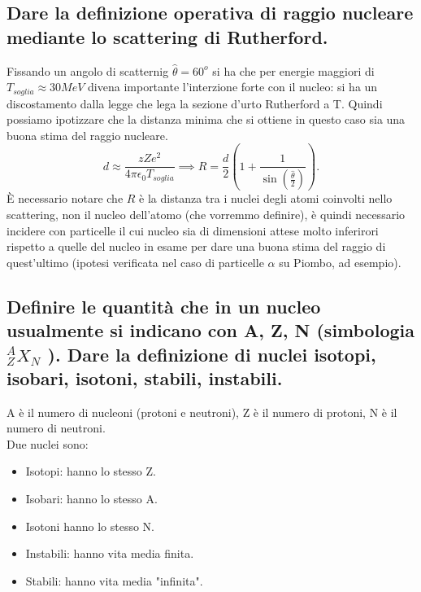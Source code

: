 \subsection[]{ Dare la definizione operativa di raggio nucleare mediante lo scattering di Rutherford.}
Fissando un angolo di scatternig $\hat{\theta} = 60^o$ si ha che per energie maggiori di $T_{soglia} \approx 30 MeV$ divena importante l'interzione forte con il nucleo: si ha un discostamento dalla legge che lega la sezione d'urto Rutherford a T. Quindi possiamo ipotizzare che la distanza minima che si ottiene in questo caso sia una buona stima del raggio nucleare.
\[
	d \approx \frac{zZ e^2}{4 \pi \epsilon_0 T_{soglia}} \implies R = \frac{d}{2}\left( 1 + \frac{1}{\sin\left( \frac{\hat{\theta}}{2} \right) } \right) 
.\] 
È necessario notare che $R$ è la distanza tra i nuclei degli atomi coinvolti nello scattering, non il nucleo dell'atomo (che vorremmo definire), è quindi necessario incidere con particelle il cui nucleo sia di dimensioni attese molto inferirori rispetto a quelle del nucleo in esame per dare una buona stima del raggio di quest'ultimo (ipotesi verificata nel caso di particelle $\alpha$ su Piombo, ad esempio).

\subsection[]{ Definire le quantità che in un nucleo usualmente si indicano con A, Z, N (simbologia ${}^A_Z X_N$ ). Dare la definizione di nuclei isotopi, isobari, isotoni, stabili, instabili.}
A è il numero di nucleoni (protoni e neutroni), Z è il numero di protoni, N è il numero di neutroni.\\
Due nuclei sono:
\begin{itemize}
	\item Isotopi: hanno lo stesso Z.
	\item Isobari: hanno lo stesso A.
	\item Isotoni hanno lo stesso N.
	\item Instabili: hanno vita media finita.
	\item Stabili: hanno vita media "infinita".
\end{itemize}

